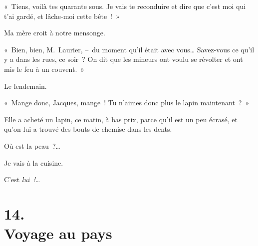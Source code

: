 \documentclass[french,twoside]{book} %
\begin{document}
« Tiens, voilà tes quarante sous. Je vais te reconduire et dire que c’est moi qui t’ai gardé, et lâche-moi cette bête ! »\par
\bigbreak
\noindent Ma mère croit à notre mensonge.\par
« Bien, bien, M. Laurier, – du moment qu’il était avec vous… Savez-vous ce qu’il y a dans les rues, ce soir ? On dit que les mineurs ont voulu se révolter et ont mis le feu à un couvent. »\par
\bigbreak
\noindent Le lendemain.\par
« Mange donc, Jacques, mange ! Tu n’aimes donc plus le lapin maintenant ? »\par
Elle a acheté un lapin, ce matin, à bas prix, parce qu’il est un peu écrasé, et qu’on lui a trouvé des bouts de chemise dans les dents.\par
Où est la peau ?…\par
Je vais à la cuisine.\par
C’est \emph{lui !…}
\section[{14. Voyage au pays}]{14. \\
Voyage au pays}\renewcommand{\leftmark}{14. \\
Voyage au pays}
\end{document}
